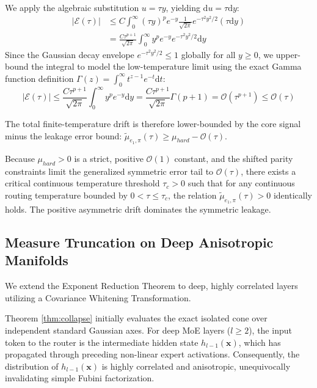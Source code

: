 \documentclass{article}
\newcommand{\1}{\mathbb{I}}
\newcommand{\diff}{\mathrm{d}}
\newcommand{\calO}{\mathcal{O}}
\newcommand{\bx}{\mathbf{x}}
\begin{document}
We apply the algebraic substitution $u = \tau y$, yielding $\diff u = \tau \diff y$:
\begin{align}
    |\mathcal{E}(\tau)| &\le C \int_{0}^\infty (\tau y)^p e^{-y} \frac{1}{\sqrt{2\pi}} e^{-\tau^2 y^2/2} (\tau \diff y) \nonumber \\
    &= \frac{C \tau^{p+1}}{\sqrt{2\pi}} \int_{0}^\infty y^p e^{-y} e^{-\tau^2 y^2/2} \diff y
\end{align}
Since the Gaussian decay envelope $e^{-\tau^2 y^2/2} \le 1$ globally for all $y \ge 0$, we upper-bound the integral to model the low-temperature limit using the exact Gamma function definition $\Gamma(z) = \int_0^\infty t^{z-1} e^{-t} \diff t$:
\begin{equation}
    |\mathcal{E}(\tau)| \le \frac{C \tau^{p+1}}{\sqrt{2\pi}} \int_{0}^\infty y^p e^{-y} \diff y = \frac{C \tau^{p+1}}{\sqrt{2\pi}} \Gamma(p+1) = \calO(\tau^{p+1}) \le \calO(\tau)
\end{equation}

The total finite-temperature drift is therefore lower-bounded by the core signal minus the leakage error bound: $\tilde{\mu}_{e_1, \pi}(\tau) \ge \mu_{hard} - \calO(\tau)$. 

Because $\mu_{hard} > 0$ is a strict, positive $\calO(1)$ constant, and the shifted parity constraints limit the generalized symmetric error tail to $\calO(\tau)$, there exists a critical continuous temperature threshold $\tau_c > 0$ such that for any continuous routing temperature bounded by $0 < \tau \le \tau_c$, the relation $\tilde{\mu}_{e_1, \pi}(\tau) > 0$ identically holds. The positive asymmetric drift dominates the symmetric leakage.

\subsection{Measure Truncation on Deep Anisotropic Manifolds}
\label{app:defense_anisotropic}

We extend the Exponent Reduction Theorem to deep, highly correlated layers utilizing a Covariance Whitening Transformation.

Theorem \ref{thm:collapse} initially evaluates the exact isolated cone over independent standard Gaussian axes. For deep MoE layers ($l \ge 2$), the input token to the router is the intermediate hidden state $h_{l-1}(\bx)$, which has propagated through preceding non-linear expert activations. Consequently, the distribution of $h_{l-1}(\bx)$ is highly correlated and anisotropic, unequivocally invalidating simple Fubini factorization.
\end{document}
